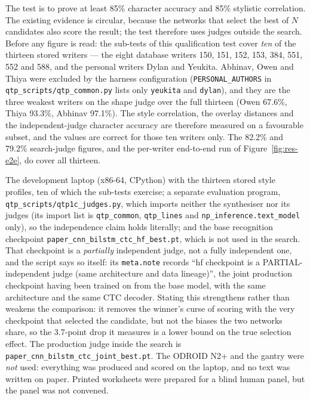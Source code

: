 
\medskip
\label{sec:res-qtp1}


            The test is to prove at least 85\% character accuracy and 85\% stylistic correlation.
            The existing evidence is circular, because the networks that select the best of $N$ candidates also score the result; the test therefore uses judges outside the search.
            Before any figure is read: the sub-tests of this qualification test cover \emph{ten} of the thirteen stored writers --- the eight database writers 150, 151, 152, 153, 384, 551, 552 and 588, and the personal writers Dylan and Yeukita.
            Abhinav, Owen and Thiya were excluded by the harness configuration (\texttt{PERSONAL\_AUTHORS} in \texttt{qtp\_scripts/qtp\_common.py} lists only \texttt{yeukita} and \texttt{dylan}), and they are the three weakest writers on the shape judge over the full thirteen (Owen 67.6\%, Thiya 93.3\%, Abhinav 97.1\%).
            The style correlation, the overlay distances and the independent-judge character accuracy are therefore measured on a favourable subset, and the values are correct for those ten writers only.
            The 82.2\% and 79.2\% search-judge figures, and the per-writer end-to-end run of Figure~\ref{fig:res-e2e}, do cover all thirteen.


            The development laptop (x86-64, CPython) with the thirteen stored style profiles, ten of which the sub-tests exercise; a separate evaluation program, \texttt{qtp\_scripts/qtp1c\_judges.py}, which imports neither the synthesiser nor its judges (its import list is \texttt{qtp\_common}, \texttt{qtp\_lines} and \texttt{np\_inference.text\_model} only), so the independence claim holds literally; and the base recognition checkpoint \texttt{paper\_cnn\_bilstm\_ctc\_hf\_best.pt}, which is not used in the search.
            That checkpoint is a \emph{partially} independent judge, not a fully independent one, and the script says so itself: its \texttt{meta.note} records ``hf checkpoint is a PARTIAL-independent judge (same architecture and data lineage)'', the joint production checkpoint having been trained on from the base model, with the same architecture and the same CTC decoder.
            Stating this strengthens rather than weakens the comparison: it removes the winner's curse of scoring with the very checkpoint that selected the candidate, but not the biases the two networks share, so the 3.7-point drop it measures is a lower bound on the true selection effect.
            The production judge inside the search is \texttt{paper\_cnn\_bilstm\_ctc\_joint\_best.pt}.
            The ODROID N2+ and the gantry were \emph{not} used: everything was produced and scored on the laptop, and no text was written on paper.
            Printed worksheets were prepared for a blind human panel, but the panel was not convened.

